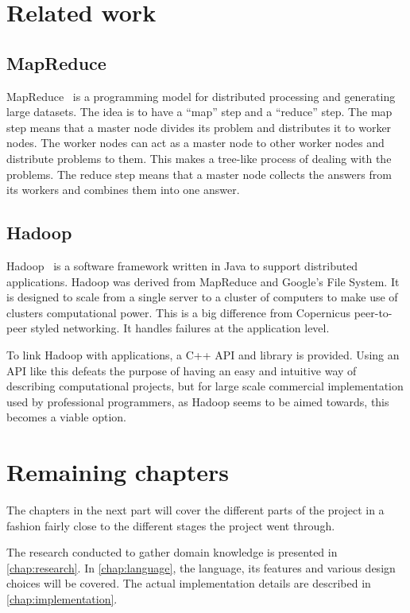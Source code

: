 \section{Related work}

\subsection{MapReduce}
MapReduce~\cite{dean:2008} is a programming model for distributed
processing and generating large datasets. The idea is to have a
``map'' step and a ``reduce'' step. The map step means that a master
node divides its problem and distributes it to worker nodes. The
worker nodes can act as a master node to other worker nodes and
distribute problems to them. This makes a tree-like process of dealing
with the problems. The reduce step means that a master node collects
the answers from its workers and combines them into one answer.

\subsection{Hadoop}
Hadoop~\cite{hadoop:online} is a software framework written in Java to
support distributed applications. Hadoop was derived from MapReduce
and Google's File System. It is designed to scale from a single server
to a cluster of computers to make use of clusters computational
power. This is a big difference from Copernicus peer-to-peer styled
networking. It handles failures at the application level.

To link Hadoop with applications, a C++ API and library is
provided. Using an API like this defeats the purpose of having an easy
and intuitive way of describing computational projects, but for large
scale commercial implementation used by professional programmers, as
Hadoop seems to be aimed towards, this becomes a viable option.


\section{Remaining chapters}
The chapters in the next part will cover the different parts of the
project in a fashion fairly close to the different stages the project
went through.

The research conducted to gather domain knowledge is presented in
\autoref{chap:research}. In \autoref{chap:language}, the language, its
features and various design choices will be covered. The actual
implementation details are described in \autoref{chap:implementation}.
